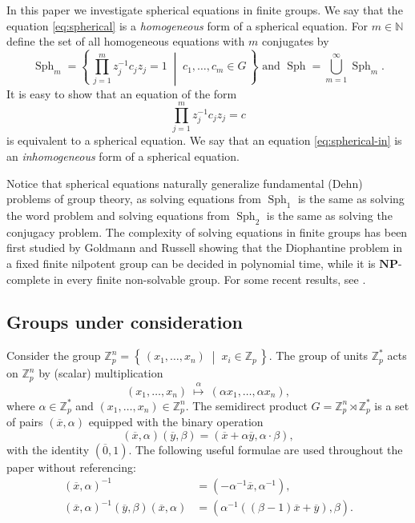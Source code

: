 \documentclass{jgcc}
\def\ovo{{\overline{0}}}
\def\ovx{{\overline{x}}}
\def\ovy{{\overline{y}}}
\def\NP{{\mathbf{NP}}}
\newcommand{\Set}[2]{\left\{\, #1 \;\middle|\; #2 \,\right\}}%
\def\MN{{\mathbb{N}}}
\def\MZ{{\mathbb{Z}}}
\DeclareMathOperator{\Sph}{Sph}
\begin{document}
In this paper we investigate spherical equations in finite groups. 
We say that the equation \eqref{eq:spherical} is a \emph{homogeneous}
form of a spherical equation. 
For $m\in\MN$ define the set of all homogeneous equations
with $m$ conjugates by
$$
\Sph_m=\Set{\prod_{j=1}^m z_j^{-1} c_j z_j = 1}{c_1,\dots,c_m\in G}
\mbox{ and }
\Sph = \bigcup_{m=1}^\infty \Sph_m.
$$
It is easy to show that an equation of the form
\begin{equation}\label{eq:spherical-in}
\prod_{j=1}^m z_j^{-1} c_j z_j = c
\end{equation}
is equivalent to a spherical equation.
We say that an equation \eqref{eq:spherical-in}
is an \emph{inhomogeneous} form of a spherical equation.

Notice that spherical equations naturally generalize fundamental (Dehn)
problems of group theory, 
as solving equations from $\Sph_1$ 
is the same as solving the word problem
and solving equations from $\Sph_2$ 
is the same as solving the conjugacy problem.
The complexity of solving equations in finite groups has been first studied by 
Goldmann and Russell \cite{Goldmann-Russell:2002} showing that the Diophantine problem 
in a fixed finite nilpotent group can be decided in polynomial time, while it is 
$\NP$-complete in every finite non-solvable group. 
For some recent results, see \cite{Foldvari-Horvath:2020,Idziak-Kawalek-Krzaczkowski-Weiss:2022,Mattes-Ushakov-Weiss:2024}. 

\subsection{Groups under consideration}

Consider the group 
$\MZ_p^n=\Set{(x_1,\ldots,x_n)}{x_i\in\MZ_p}$.
The group of units $\MZ_p^\ast$ acts on $\MZ_p^n$
by (scalar) multiplication
$$
(x_1,\ldots,x_n)
\ \stackrel{\alpha}{\mapsto}\ 
(\alpha x_1,\ldots,\alpha x_n),
$$
where $\alpha\in\MZ_p^\ast$ and $(x_1,\ldots,x_n)\in\MZ_p^n$.
The semidirect product $G = \MZ_p^n\rtimes \MZ_p^\ast$ 
is a set of pairs $(\ovx,\alpha)$ equipped with the binary operation
$$
(\ovx,\alpha)
(\ovy,\beta) = (\ovx+\alpha\ovy,\alpha\cdot\beta),
$$
with the identity $(\ovo,1)$.
The following useful formulae are used throughout the paper
without referencing:
\begin{align*}
(\ovx,\alpha)^{-1} 
&= 
(-\alpha^{-1}\ovx,\alpha^{-1}),\\
(\ovx,\alpha)^{-1}
(\ovy,\beta)
(\ovx,\alpha)
&=
(\alpha^{-1}((\beta-1)\ovx+\ovy),\beta).
\end{align*}
\end{document}
